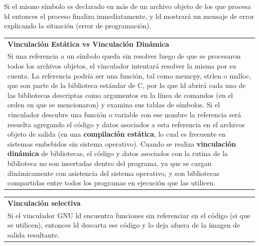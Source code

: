 \documentclass[output=paper, 
colorlinks,
citecolor=brown,
newtxmath
]{langscibook}
\begin{document}
Si el mismo símbolo es declarado en más de un archivo objeto de los que 
procesa ld entonces el proceso finaliza inmediatamente, y ld mostrará
un mensaje de error explicando la situación (error de programación).

\begin{center}
\begin{tabularx}{0.95\textwidth}{|X|}
\hline
\rowcolor{lightgray}
\textbf{Vinculación Estática vs Vinculación Dinámica}\\
Si una referencia a un símbolo queda sin resolver luego de
que se procesaron todos los archivos objetos, el vinculador intentará 
resolver la misma por su cuenta.
La referencia podría ser una función, tal como memcpy, strlen o malloc, que son
parte de la biblioteca estándar de C, por lo que ld abrirá cada uno de las
bibliotecas descriptas como argumentos en la línea de comandos (en el orden
en que se mencionaron) y examina sus tablas de símbolos. 
Si el vinculador descubre una función o variable con ese nombre la referencia
será resuelta agregando el código y datos asociados a esta referencia en el 
archivos objeto de salida (en una \textbf{compilación estática}, lo cual es
frecuente en sistemas embebidos sin sistema operativo). 
Cuando se realiza \textbf{vinculación dinámica} de bibliotecas, el código 
y datos asociados con la rutina de la biblioteca no son insertadas dentro
del programa, ya que se cargan dinámicamente con asistencia
del sistema operativo, y son bibliotecas compartidas entre todos
los programas en ejecución que las utilicen.\\
\hline
\end{tabularx}
\end{center}

\begin{center}
\begin{tabularx}{\textwidth}{|X|}
\hline
\rowcolor{lightgray}
\textbf{Vinculación selectiva}\\
Si el vinculador GNU ld encuentra funciones sin referenciar en el código
(si que se utilicen), entonces ld descarta ese código y lo deja
afuera de la imagen de salida resultante.\\
\hline
\end{tabularx}
\end{center}
\end{document}
